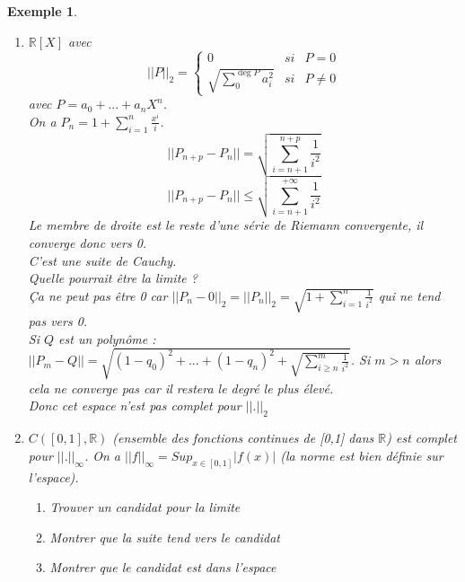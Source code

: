 \documentclass[a4paper, oneside]{report}
\theoremstyle{break}
\newtheorem{exem}[thm]{Exemple}
\newcommand{\R}{\mathbb{R}}
\begin{document}
\begin{exem}
\begin{enumerate}
\item $\R[X]$ avec
$$||P||_2 = \left\{\begin{array}{lll}
0 &si& P=0\\
\sqrt{\sum_{0}^{\deg P}a_i^2} &si& P\neq 0
\end{array}\right.$$
avec $P=a_0+...+a_nX^n$.\\
On a $P_n=1+\sum_{i=1}^n\frac{x^i}{i}$.\\
$$||P_{n+p}-P_n|| = \sqrt{\sum_{i=n+1}^{n+p}\frac{1}{i^2}}$$
$$||P_{n+p}-P_n|| \leq \sqrt{\sum_{i=n+1}^{+\infty}\frac{1}{i^2}}$$
Le membre de droite est le reste d'une série de Riemann convergente, il converge donc vers 0.\\
C'est une suite de Cauchy.\\
Quelle pourrait être la limite ?\\
Ça ne peut pas être 0 car $||P_n-0||_2=||P_n||_2=\sqrt{1+\sum_{i=1}^{n}\frac{1}{i^2}}$ qui ne tend pas vers 0.\\
Si $Q$ est un polynôme : $||P_m-Q|| = \sqrt{(1-q_0)^2+...+(1-q_n)^2+\sqrt{\sum_{i\geq n}^{m}\frac{1}{i^2}} }$. Si $m>n$ alors cela ne converge pas car il restera le degré le plus élevé.\\
Donc cet espace n'est pas complet pour $||.||_2$

\item $C([0,1],\R)$ (ensemble des fonctions continues de [0,1] dans $\R$) est complet pour $||.||_\infty$. On a $||f||_\infty = Sup_{x\in [0,1]}|f(x)|$ (la norme est bien définie sur l'espace).\\
\begin{enumerate}
\item Trouver un candidat pour la limite
\item Montrer que la suite tend vers le candidat
\item Montrer que le candidat est dans l'espace
\end{enumerate}


\end{enumerate}
\end{exem}
\end{document}
